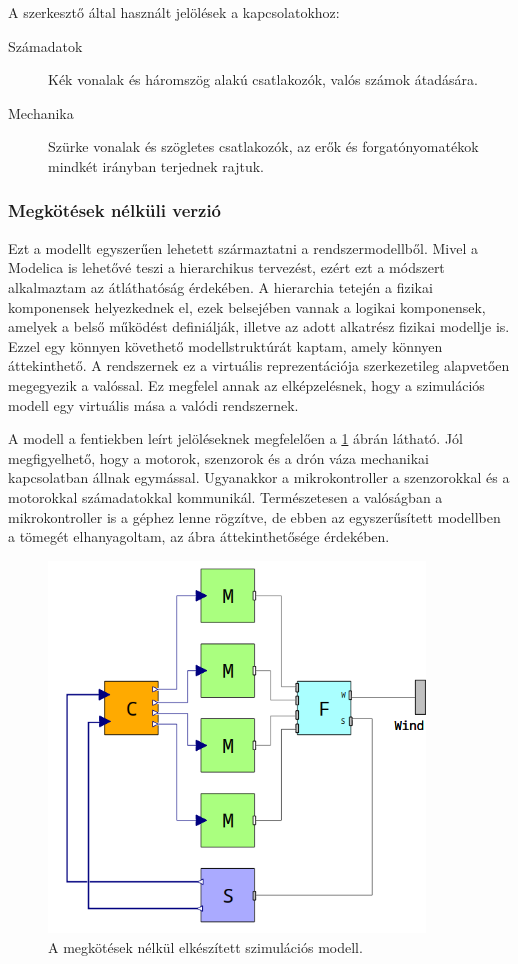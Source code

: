     A szerkesztő által használt jelölések a kapcsolatokhoz:

    \begin{description}
        \item[Számadatok] Kék vonalak és háromszög alakú csatlakozók, valós számok átadására.
        \item[Mechanika] Szürke vonalak és szögletes csatlakozók, az erők és forgatónyomatékok mindkét irányban terjednek rajtuk.
    \end{description}

        \subsubsection{Megkötések nélküli verzió}
        Ezt a modellt egyszerűen lehetett származtatni a rendszermodellből. Mivel a Modelica is lehetővé teszi a hierarchikus tervezést, ezért ezt a módszert alkalmaztam az átláthatóság érdekében.
        A hierarchia tetején a fizikai komponensek helyezkednek el, ezek belsejében vannak a logikai komponensek, amelyek a belső működést definiálják, illetve az adott alkatrész fizikai modellje is.
        Ezzel egy könnyen követhető modellstruktúrát kaptam, amely könnyen áttekinthető. A rendszernek ez a virtuális reprezentációja szerkezetileg alapvetően megegyezik a valóssal.
        Ez megfelel annak az elképzelésnek, hogy a szimulációs modell egy virtuális mása a valódi rendszernek.

        A modell a fentiekben leírt jelöléseknek megfelelően a \ref{fig:stdSzim} ábrán látható.
        Jól megfigyelhető, hogy a motorok, szenzorok és a drón váza mechanikai kapcsolatban állnak egymással.
        Ugyanakkor a mikrokontroller a szenzorokkal és a motorokkal számadatokkal kommunikál.
        Természetesen a valóságban a mikrokontroller is a géphez lenne rögzítve, de ebben az egyszerűsített modellben a tömegét elhanyagoltam, az ábra áttekinthetősége érdekében.

        \begin{figure}[!ht]
            \centering
            \includegraphics[width=100mm, keepaspectratio]{figures/stdSzim.png}
            \caption{A megkötések nélkül elkészített szimulációs modell.} 
            \label{fig:stdSzim}
        \end{figure}

